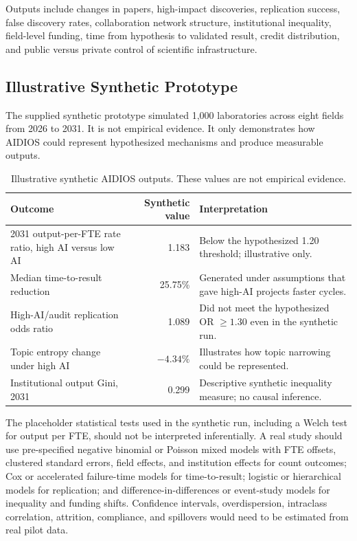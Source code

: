 \documentclass[12pt]{article}
\begin{document}
Outputs include changes in papers, high-impact discoveries, replication success, false discovery rates, collaboration network structure, institutional inequality, field-level funding, time from hypothesis to validated result, credit distribution, and public versus private control of scientific infrastructure.

\subsection{Illustrative Synthetic Prototype}

The supplied synthetic prototype simulated 1,000 laboratories across eight fields from 2026 to 2031. It is not empirical evidence. It only demonstrates how AIDIOS could represent hypothesized mechanisms and produce measurable outputs.

\begin{table}[H]
\centering
\caption{Illustrative synthetic AIDIOS outputs. These values are not empirical evidence.}
\small
\begin{tabularx}{\textwidth}{X r X}
\toprule
\textbf{Outcome} & \textbf{Synthetic value} & \textbf{Interpretation} \\
\midrule
2031 output-per-FTE rate ratio, high AI versus low AI & 1.183 & Below the hypothesized 1.20 threshold; illustrative only. \\
Median time-to-result reduction & 25.75\% & Generated under assumptions that gave high-AI projects faster cycles. \\
High-AI/audit replication odds ratio & 1.089 & Did not meet the hypothesized OR $\geq 1.30$ even in the synthetic run. \\
Topic entropy change under high AI & $-4.34\%$ & Illustrates how topic narrowing could be represented. \\
Institutional output Gini, 2031 & 0.299 & Descriptive synthetic inequality measure; no causal inference. \\
\bottomrule
\end{tabularx}
\end{table}

The placeholder statistical tests used in the synthetic run, including a Welch test for output per FTE, should not be interpreted inferentially. A real study should use pre-specified negative binomial or Poisson mixed models with FTE offsets, clustered standard errors, field effects, and institution effects for count outcomes; Cox or accelerated failure-time models for time-to-result; logistic or hierarchical models for replication; and difference-in-differences or event-study models for inequality and funding shifts. Confidence intervals, overdispersion, intraclass correlation, attrition, compliance, and spillovers would need to be estimated from real pilot data.
\end{document}
